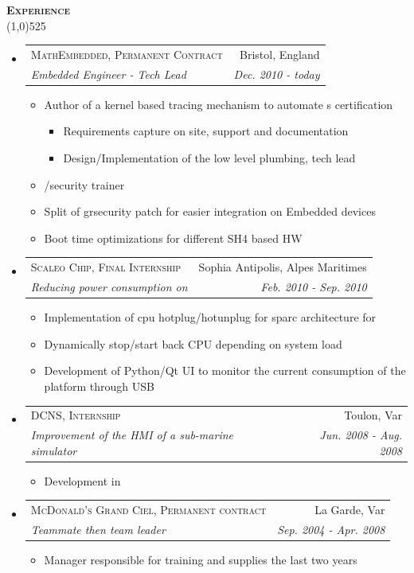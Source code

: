 \documentclass[letterpaper,11pt]{article}
\makeatletter
\newcommand{\resitem}[1]{\item #1}
\newcommand{\titlecolor}[0]{RoyalBlue4}
\newcommand{\bulletcolor}[0]{darkgray}
\newcommand{\resheading}[1]{
  \vspace{10pt}
  {\Large
        \textsc{\textcolor{\titlecolor}{\textbf{#1}}}
  } \\
  \vspace{-10.5pt}
  \hspace{-1pt}\textcolor{\titlecolor}{\line(1,0){525}}
}
\newcommand{\ressubheading}[4]{
  \vspace{8pt}
  \begin{tabular*}{7.0in}{l@{\extracolsep{\fill}}r}
    \textsc{#1} & #2 \\
    \textsl{#3} & \textit{#4} \\
  \end{tabular*}
}
\newcommand{\prettylist}[0]{
  \begin{itemize}
    \renewcommand{\labelitemi}{{\tiny \textcolor{\bulletcolor}{$\bullet$}}}
    \renewcommand{\labelitemiii}{$\cdot$}
}
\newcommand{\acro}[1]{
  \hspace{-1pt}{\small\textsc{#1}}\hspace{-3pt}
}
\makeatother
\begin{document}
\resheading{Experience}
\prettylist
\item
  \ressubheading{MathEmbedded, Permanent Contract}{Bristol, England}{Embedded
    Engineer - Tech Lead}{Dec. 2010 - today}
  \begin{itemize}
    \resitem{Author of a kernel based tracing mechanism to automate \acro{STB}s certification}
    \begin{itemize}
      \resitem{Requirements capture on site, support and documentation}
      \resitem{Design/Implementation of the low level plumbing, tech lead}
    \end{itemize}
    \resitem{\acro{Linux}/security trainer}
    \resitem{Split of grsecurity patch for easier integration on Embedded devices}
    \resitem{Boot time optimizations for different SH4 based HW}
  \end{itemize}
\item
  \ressubheading{Scaleo Chip, Final Internship}{Sophia Antipolis, Alpes Maritimes}{Reducing power consumption on \acro{Linux-SMP SoC}}{Feb. 2010 - Sep. 2010}
  \begin{itemize}
    \resitem{Implementation of cpu hotplug/hotunplug for sparc architecture for \acro{Linux}} 
    \resitem{Dynamically stop/start back CPU depending on system load}
    \resitem{Development of Python/Qt UI to monitor the current consumption of the platform through USB}
  \end{itemize}
\item
  \ressubheading{DCNS, Internship}{Toulon, Var}{Improvement of the HMI of a sub-marine simulator}{Jun. 2008 - Aug. 2008}
  \begin{itemize}
    \resitem Development in\acro{OpenMotif/C}
  \end{itemize}
\item
  \ressubheading{McDonald's Grand Ciel, Permanent contract}{La Garde,
    Var}{Teammate then team leader}{Sep. 2004 - Apr. 2008}
  \begin{itemize}
    \resitem Manager responsible for training and supplies the last two years
  \end{itemize}
\end{itemize}
\end{document}
